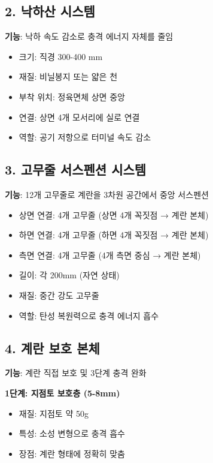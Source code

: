 \documentclass[a4paper,12pt]{article}
\begin{document}
\begin{CJK}{UTF8}{mj}
\subsection{2. 낙하산 시스템}

\textbf{기능}: 낙하 속도 감소로 충격 에너지 자체를 줄임

\begin{itemize}
    \item 크기: 직경 300-400 mm
    \item 재질: 비닐봉지 또는 얇은 천
    \item 부착 위치: 정육면체 상면 중앙
    \item 연결: 상면 4개 모서리에 실로 연결
    \item 역할: 공기 저항으로 터미널 속도 감소
\end{itemize}

\subsection{3. 고무줄 서스펜션 시스템}

\textbf{기능}: 12개 고무줄로 계란을 3차원 공간에서 중앙 서스펜션

\begin{itemize}
    \item 상면 연결: 4개 고무줄 (상면 4개 꼭짓점 → 계란 본체)
    \item 하면 연결: 4개 고무줄 (하면 4개 꼭짓점 → 계란 본체)
    \item 측면 연결: 4개 고무줄 (4개 측면 중심 → 계란 본체)
    \item 길이: 각 200mm (자연 상태)
    \item 재질: 중간 강도 고무줄
    \item 역할: 탄성 복원력으로 충격 에너지 흡수
\end{itemize}

\subsection{4. 계란 보호 본체}

\textbf{기능}: 계란 직접 보호 및 3단계 충격 완화

\textbf{1단계: 지점토 보호층 (5-8mm)}
\begin{itemize}
    \item 재질: 지점토 약 50g
    \item 특성: 소성 변형으로 충격 흡수
    \item 장점: 계란 형태에 정확히 맞춤
\end{itemize}


\end{CJK}
\end{document}
